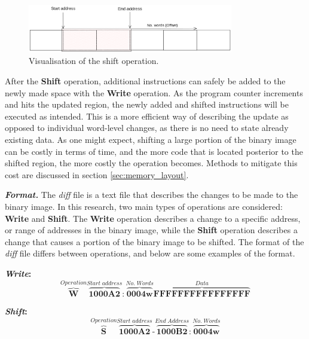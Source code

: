 \begin{figure}[!ht]
    \centering
    \includegraphics[width=0.8\textwidth]{img/shift_example.png}
    \caption{Visualisation of the shift operation.}
    \label{fig:shift_example}
\end{figure}
After the \textbf{Shift} operation, additional instructions can safely be added to the newly made space with the \textbf{Write} operation. As the program counter increments and hits the updated region, the newly added and shifted instructions will be executed as intended. This is a more efficient way of describing the update as opposed to individual word-level changes, as there is no need to state already existing data. As one might expect, shifting a large portion of the binary image can be costly in terms of time, and the more code that is located posterior to the shifted region, the more costly the operation becomes. Methods to mitigate this cost are discussed in section \ref{sec:memory_layout}.

\textbf{\textit{Format.}} 
The \textit{diff} file is a text file that describes the changes to be made to the binary image. In this research, two main types of operations are considered: \textbf{Write} and \textbf{Shift}. The \textbf{Write} operation describes a change to a specific address, or range of addresses in the binary image, while the \textbf{Shift} operation describes a change that causes a portion of the binary image to be shifted. The format of the \textit{diff} file differs between operations, and below are some examples of the format.

\textbf{\textit{Write}:}
\begin{equation*}
    \overbrace{\textbf{W}}^{Operation}
    \overbrace{\textbf{1000A2}}^{Start\;address}    :
    \overbrace{\textbf{0004w}}^{No.\;Words}
    \overbrace{\textbf{FFFFFFFFFFFFFFFF}}^{Data}
\end{equation*}

\textbf{\textit{Shift}:}
\begin{equation*}
    \overbrace{\textbf{S}}^{Operation}
    \overbrace{\textbf{1000A2}}^{Start\;address}    \text{-}
    \overbrace{\textbf{1000B2}}^{End\;Address}      :
    \overbrace{\textbf{0004w}}^{No.\;Words}
\end{equation*}


